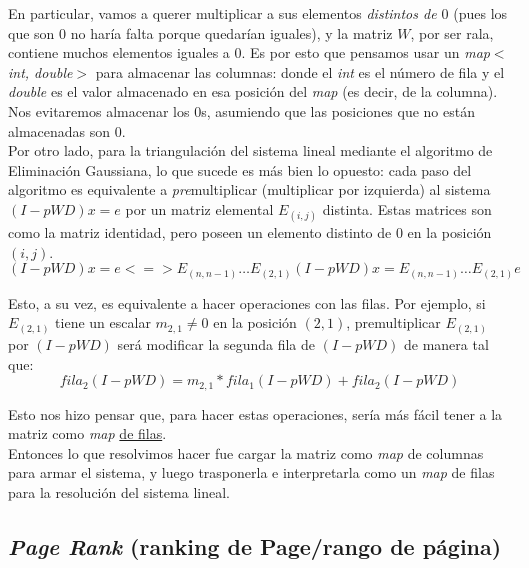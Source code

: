 		En particular, vamos a querer multiplicar a sus elementos \textit{distintos de $0$} (pues los que son $0$ no haría falta porque quedarían iguales), y la matriz $W$, por ser rala, contiene muchos elementos iguales a $0$. Es por esto que pensamos usar un \textit{map$<$int, double$>$} para almacenar las columnas: donde el \textit{int} es el número de fila y el \textit{double} es el valor almacenado en esa posición del \textit{map} (es decir, de la columna). Nos evitaremos almacenar los $0$s, asumiendo que las posiciones que no están almacenadas son $0$. \\

		Por otro lado, para la triangulación del sistema lineal mediante el algoritmo de Eliminación Gaussiana, lo que sucede es más bien lo opuesto: cada paso del algoritmo es equivalente a \textit{pre}multiplicar (multiplicar por izquierda) al sistema $(I - pWD) x = e$ por un matriz elemental $E_{(i,j)}$ distinta. Estas matrices son como la matriz identidad, pero poseen un elemento distinto de $0$ en la posición $(i,j)$. \\

		\begin{equation}
			(I - pWD) x = e <=> E_{(n,n-1)} \hdots E_{(2,1)} (I - pWD) x = E_{(n,n-1)} \hdots E_{(2,1)} e
		\end{equation}

		Esto, a su vez, es equivalente a hacer operaciones con las filas. Por ejemplo, si $E_{(2,1)}$ tiene un escalar $m_{2,1} \neq 0$ en la posición $(2,1)$, premultiplicar $E_{(2,1)}$ por $(I - pWD)$ será modificar la segunda fila de $(I - pWD)$ de manera tal que: \\

		\begin{equation}
			fila_{2}(I-pWD) = m_{2,1} *  fila_{1}(I-pWD) + fila_{2}(I-pWD)
		\end{equation}

		Esto nos hizo pensar que, para hacer estas operaciones, sería más fácil tener a la matriz como \textit{map} \underline{de filas}. \\

		Entonces lo que resolvimos hacer fue cargar la matriz como \textit{map} de columnas para armar el sistema, y luego trasponerla e interpretarla como un \textit{map} de filas para la resolución del sistema lineal. \\

	\subsection{\textit{Page Rank} (ranking de Page/rango de página)}


